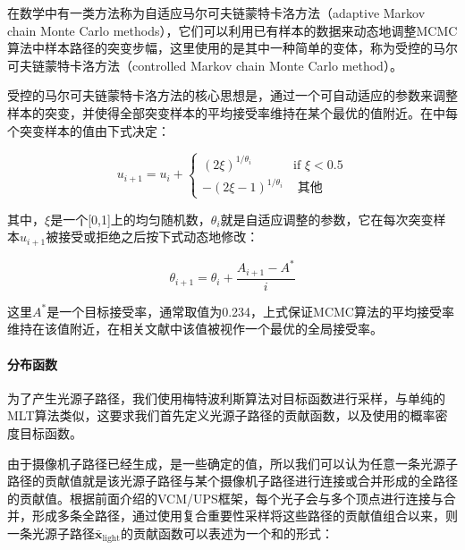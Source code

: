 在数学中有一类方法称为自适应马尔可夫链蒙特卡洛方法（adaptive Markov chain Monte Carlo methods）\cite{a:AtutorialonadaptiveMCMC}，它们可以利用已有样本的数据来动态地调整MCMC算法中样本路径的突变步幅，这里使用的是其中一种简单的变体，称为受控的马尔可夫链蒙特卡洛方法（controlled Markov chain Monte Carlo method）\cite{a:Controlledmcmcforoptimalsampling}。

受控的马尔可夫链蒙特卡洛方法的核心思想是，通过一个可自动适应的参数来调整样本的突变，并使得全部突变样本的平均接受率维持在某个最优的值附近。在\cite{a:RobustLightTransportSimulationviaMetropolisedBidirectionalEstimators}中每个突变样本的值由下式决定：

\begin{equation}
	u_{i+1}=u_i+\begin{cases}
		(2\xi)^{1/\theta_i} & \text{if } \xi<0.5 \\
		-(2\xi-1)^{1/\theta_i} & \text{ 其他}
	\end{cases}
\end{equation}

\noindent 其中，$\xi$是一个[0,1]上的均匀随机数，$\theta_i$就是自适应调整的参数，它在每次突变样本$u_{i+1}$被接受或拒绝之后按下式动态地修改：

\begin{equation}
	\theta_{i+1}=\theta_i+\frac{A_{i+1}-A^{*}}{i}
\end{equation}

\noindent 这里$A^{*}$是一个目标接受率，通常取值为0.234，上式保证MCMC算法的平均接受率维持在该值附近，在相关文献中\cite{a:Weakconvergenceandoptimalscalingofrandomwalkmetropolisalgorithms}该值被视作一个最优的全局接受率。




\paragraph{分布函数}
为了产生光源子路径，我们使用梅特波利斯算法对目标函数进行采样，与单纯的MLT算法类似，这要求我们首先定义光源子路径的贡献函数，以及使用的概率密度目标函数。

由于摄像机子路径已经生成，是一些确定的值，所以我们可以认为任意一条光源子路径的贡献值就是该光源子路径与某个摄像机子路径进行连接或合并形成的全路径的贡献值。根据前面介绍的VCM/UPS框架，每个光子会与多个顶点进行连接与合并，形成多条全路径，通过使用复合重要性采样将这些路径的贡献值组合以来，则一条光源子路径$\bar{\mathbf{x}}_{\text{light}}$的贡献函数可以表述为一个和的形式：

